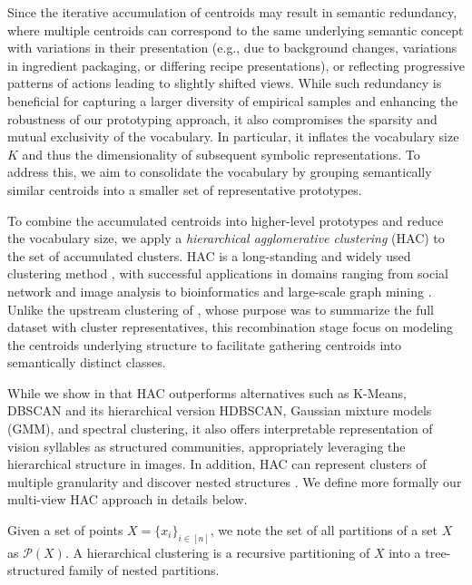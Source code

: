         Since the iterative accumulation of centroids may result in semantic redundancy, where multiple centroids can correspond to the same underlying semantic concept with variations in their presentation (e.g., due to background changes, variations in ingredient packaging, or differing recipe presentations), or reflecting progressive patterns of actions leading to slightly shifted views. While such redundancy is beneficial for capturing a larger diversity of empirical samples and enhancing the robustness of our prototyping approach, it also compromises the sparsity and mutual exclusivity of the vocabulary. In particular, it inflates the vocabulary size $K$ and thus the dimensionality of subsequent symbolic representations. To address this, we aim to consolidate the vocabulary by grouping semantically similar centroids into a smaller set of representative prototypes.

        To combine the accumulated centroids into higher-level prototypes and reduce the vocabulary size, we apply a \emph{hierarchical agglomerative clustering} (HAC) to the set of accumulated clusters. HAC is a long-standing and widely used clustering method \cite{Murtagh2017, Muller2011, Mllner2013, Murtagh2011, Mllner2011ModernHA}, with successful applications in domains ranging from social network and image analysis to bioinformatics and large-scale graph mining \cite{almahamid2022agglomerative, Tie2018,  NIPS2013_35cf8659, teraHAC, Hua2017, Park2011, Tie2018, 10.1145/3097983.3098079, 10.1145/584792.584877}. Unlike the upstream clustering of , whose purpose was to summarize the full dataset with cluster representatives, this recombination stage focus on modeling the centroids underlying structure to facilitate gathering centroids into semantically distinct classes.

        
        While we show in  that HAC outperforms alternatives such as K-Means, DBSCAN and its hierarchical version HDBSCAN, Gaussian mixture models (GMM), and spectral clustering, it also offers interpretable representation of vision syllables as structured communities, appropriately leveraging the hierarchical structure in images. In addition, HAC can represent clusters of multiple granularity \cite{Taxonomy2014} and discover nested structures \cite{GAVRYUSHKIN2016197}. We define more formally our multi-view HAC approach in details below.

        Given a set of points $X = \{x_i\}_{i \in [n]}$, we note the set of all partitions of a set $X$ as $\mathcal{P}(X)$. A hierarchical clustering is a recursive partitioning of $X$ into a tree-structured family of nested partitions.

